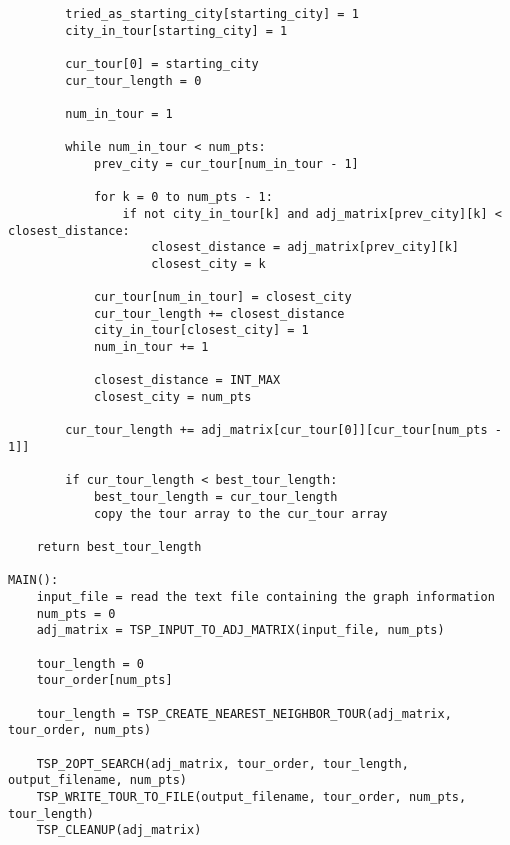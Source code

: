 \documentclass[../report/main.tex]{subfiles}
\begin{document}
\begin{verbatim}
        tried_as_starting_city[starting_city] = 1
        city_in_tour[starting_city] = 1

        cur_tour[0] = starting_city
        cur_tour_length = 0

        num_in_tour = 1

        while num_in_tour < num_pts:
            prev_city = cur_tour[num_in_tour - 1]

            for k = 0 to num_pts - 1:
                if not city_in_tour[k] and adj_matrix[prev_city][k] < closest_distance:
                    closest_distance = adj_matrix[prev_city][k]
                    closest_city = k

            cur_tour[num_in_tour] = closest_city
            cur_tour_length += closest_distance
            city_in_tour[closest_city] = 1
            num_in_tour += 1

            closest_distance = INT_MAX
            closest_city = num_pts

        cur_tour_length += adj_matrix[cur_tour[0]][cur_tour[num_pts - 1]]

        if cur_tour_length < best_tour_length:
            best_tour_length = cur_tour_length
            copy the tour array to the cur_tour array

    return best_tour_length

MAIN():
    input_file = read the text file containing the graph information
    num_pts = 0
    adj_matrix = TSP_INPUT_TO_ADJ_MATRIX(input_file, num_pts)

    tour_length = 0
    tour_order[num_pts]

    tour_length = TSP_CREATE_NEAREST_NEIGHBOR_TOUR(adj_matrix, tour_order, num_pts)

    TSP_2OPT_SEARCH(adj_matrix, tour_order, tour_length, output_filename, num_pts)
    TSP_WRITE_TOUR_TO_FILE(output_filename, tour_order, num_pts, tour_length)
    TSP_CLEANUP(adj_matrix)
\end{verbatim}
\end{document}
